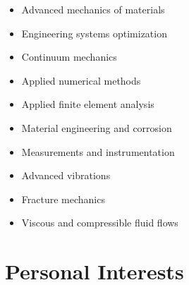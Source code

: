 \documentclass[10pt]{article} %
\begin{document}
\begin{paracol}{2} %

	\begin{itemize}\itemsep0em 
		\item Advanced mechanics of materials
		\item Engineering systems optimization
		\item Continuum mechanics
		\item Applied numerical methods
		\item Applied finite element analysis
	\end{itemize}
		
	
	\switchcolumn %
	

	\begin{itemize}\itemsep0em 
		\item Material engineering and corrosion
		\item Measurements and instrumentation
		\item Advanced vibrations
		\item Fracture mechanics	
		\item Viscous and compressible fluid flows
	\end{itemize}

	
\end{paracol}



\section{Personal Interests}


\setlength{} %
\end{document}
